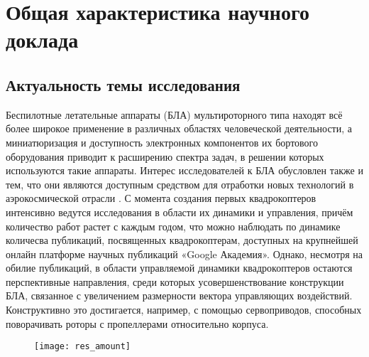 
\chapter{Общая характеристика научного доклада}

\section{Актуальность темы исследования}

Беспилотные летательные аппараты (БЛА) мультироторного типа находят всё более широкое применение в различных областях человеческой деятельности, а миниатюризация и доступность электронных компонентов их бортового оборудования приводит к расширению спектра задач, в решении которых используются такие аппараты.
Интерес исследователей к БЛА обусловлен также и тем, что они являются доступным средством для отработки новых технологий в аэрокосмической отрасли \cite{Otero01}.
С момента создания первых квадрокоптеров интенсивно ведутся исследования в области их динамики и управления, причём количество работ растет с каждым годом, что можно наблюдать по динамике количесва публикаций, посвященных квадрокоптерам, доступных на крупнейшей онлайн платформе научных публикаций «Google Академия».
Однако, несмотря на обилие публикаций, в области управляемой динамики квадрокоптеров остаются перспективные направления, среди которых усовершенствование конструкции БЛА, связанное с увеличением размерности вектора управляющих воздействий.
Конструктивно это достигается, например, с помощью сервоприводов, способных поворачивать роторы с пропеллерами относительно корпуса.
\begin{figure}[h!]
	\centering
	\texttt{[image: res\_amount]}
	\label{res_amount}
\end{figure}

